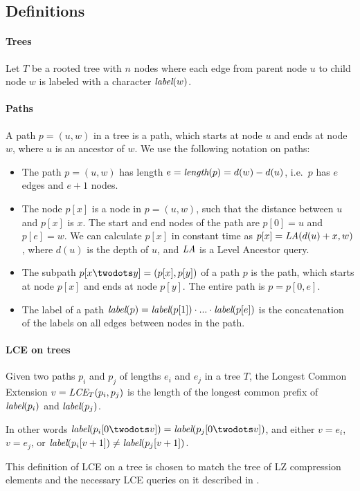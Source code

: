\documentclass[a4]{article}
\newcommand*{\pref}{\prettyref}
\begin{document}
\subsection{Definitions\label{sec:tree-def}}

\paragraph{Trees}
Let $T$ be a rooted tree with $n$ nodes where each edge from parent node $u$ to child node $w$ is labeled with a character $\textit{label}(w)$.

\paragraph{Paths}
A path $p=(u,w)$ in a tree is a path, which starts at node $u$ and ends at node $w$, where $u$ is an ancestor of $w$. We use the following notation on paths:
\begin{itemize}
\item The path $p=(u,w)$ has length $e=\textit{length}(p)=d(w)-d(u)$, i.e.\ $p$ has $e$ edges and $e+1$ nodes.
\item The node $p[x]$ is a node in $p=(u,w)$, such that the distance between $u$ and $p[x]$ is $x$. The start and end nodes of the path are $p[0]=u$ and $p[e]=w$. We can calculate $p[x]$ in constant time as $p[x]=\textit{LA}(d(u)+x,w)$, where $d(u)$ is the depth of $u$, and $\textit{LA}$ is a Level Ancestor query.
\item The subpath $p[x\twodots y]=(p[x],p[y])$ of a path $p$ is the path, which starts at node $p[x]$ and ends at node $p[y]$. The entire path is $p = p[0,e]$.
\item The label of a path $\textit{label}(p)=\textit{label}(p[1])\cdot...\cdot\textit{label}(p[e])$ is the concatenation of the labels on all edges between nodes in the path.
\end{itemize}

\paragraph{LCE on trees}
Given two paths $p_i$ and $p_j$ of lengths $e_i$ and $e_j$ in a tree $T$, the Longest Common Extension $v=\textit{LCE}_T(p_i, p_j)$ is the length of the longest common prefix of $\textit{label}(p_i)$ and $\textit{label}(p_j)$.

In other words $\zlabel(p_i[0\twodots v])=\zlabel(p_j[0\twodots v])$, and either $v=e_i$, $v=e_j$, or $\textit{label}(p_i[v+1]) \neq \textit{label}(p_j[v+1])$.

This definition of LCE on a tree is chosen to match the tree of LZ compression elements and the necessary LCE queries on it described in \pref{sec:lz-other}.
\end{document}
